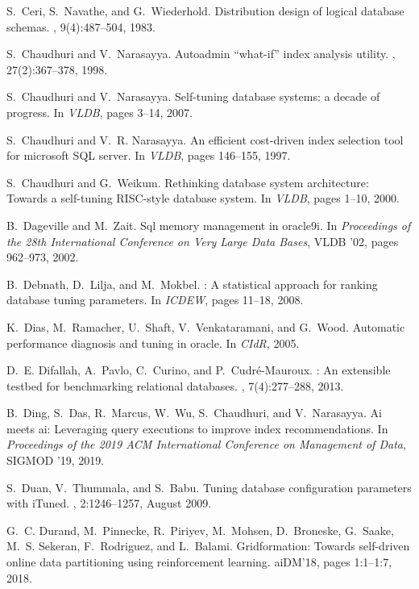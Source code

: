 \documentclass[11pt,times]{article}
\begin{document}
\begin{thebibliography}{10}
S.~Ceri, S.~Navathe, and G.~Wiederhold.
\newblock Distribution design of logical database schemas.
, 9(4):487--504, 1983.

S.~Chaudhuri and V.~Narasayya.
\newblock Autoadmin ``what-if'' index analysis utility.
, 27(2):367--378, 1998.

S.~Chaudhuri and V.~Narasayya.
\newblock Self-tuning database systems: a decade of progress.
\newblock In {\em VLDB}, pages 3--14, 2007.

S.~Chaudhuri and V.~R. Narasayya.
\newblock An efficient cost-driven index selection tool for microsoft {SQL}
  server.
\newblock In {\em VLDB}, pages 146--155, 1997.

S.~Chaudhuri and G.~Weikum.
\newblock Rethinking database system architecture: Towards a self-tuning
  {RISC}-style database system.
\newblock In {\em VLDB}, pages 1--10, 2000.

B.~Dageville and M.~Zait.
\newblock Sql memory management in oracle9i.
\newblock In {\em Proceedings of the 28th International Conference on Very
  Large Data Bases}, VLDB '02, pages 962--973, 2002.

B.~Debnath, D.~Lilja, and M.~Mokbel.
: A statistical approach for ranking database tuning
  parameters.
\newblock In {\em ICDEW}, pages 11--18, 2008.

K.~Dias, M.~Ramacher, U.~Shaft, V.~Venkataramani, and G.~Wood.
\newblock Automatic performance diagnosis and tuning in oracle.
\newblock In {\em CIdR}, 2005.

D.~E. Difallah, A.~Pavlo, C.~Curino, and P.~Cudr{\'{e}}{-}Mauroux.
: An extensible testbed for benchmarking relational
  databases.
, 7(4):277--288, 2013.

B.~Ding, S.~Das, R.~Marcus, W.~Wu, S.~Chaudhuri, and V.~Narasayya.
\newblock Ai meets ai: Leveraging query executions to improve index
  recommendations.
\newblock In {\em Proceedings of the 2019 ACM International Conference on
  Management of Data}, SIGMOD '19, 2019.

S.~Duan, V.~Thummala, and S.~Babu.
\newblock Tuning database configuration parameters with {iTuned}.
, 2:1246--1257, August 2009.

G.~C. Durand, M.~Pinnecke, R.~Piriyev, M.~Mohsen, D.~Broneske, G.~Saake, M.~S.
  Sekeran, F.~Rodriguez, and L.~Balami.
\newblock Gridformation: Towards self-driven online data partitioning using
  reinforcement learning.
\newblock aiDM'18, pages 1:1--1:7, 2018.


\end{thebibliography}
\end{document}

